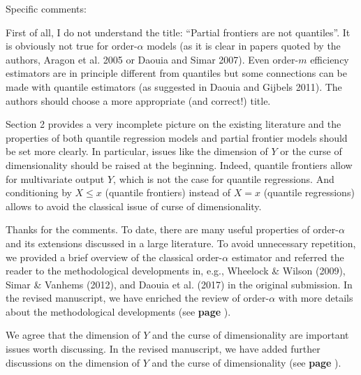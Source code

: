 \documentclass[12pt]{article}
\newcommand{\np}{\vskip 0.3cm}
\begin{document}
\np
\np
\np
\begin{sf}
{\blueb Specific comments: \np

First of all, I do not understand the title: ``Partial frontiers are not quantiles''. It is obviously not true for order-$\alpha$ models (as it is clear in papers quoted by the authors, Aragon et al. 2005 or Daouia and Simar 2007). Even order-$m$ efficiency estimators are in principle different from quantiles but some connections can be made with quantile estimators (as suggested in Daouia and Gijbels 2011). The authors should choose a more appropriate (and correct!) title.}
\end{sf}
\begin{response}





\end{response}


\np
\np
\np
\begin{sf}
{\blueb 
Section 2 provides a very incomplete picture on the existing literature and the properties of both quantile regression models and partial frontier models should be set more clearly. In particular, issues like the dimension of $Y$ or the curse of dimensionality should be raised at the beginning. Indeed, quantile frontiers allow for multivariate output $Y$, which is not the case for quantile regressions. And conditioning by $X \le x$ (quantile frontiers) instead of $X = x$ (quantile regressions) allows to avoid the classical issue of curse of dimensionality. }
\end{sf}
\begin{response}
Thanks for the comments. To date, there are many useful properties of order-$\alpha$ and its extensions discussed in a large literature. To avoid unnecessary repetition, we provided a brief overview of the classical order-$\alpha$ estimator and referred the reader to the methodological developments in, e.g., Wheelock \& Wilson (2009), Simar \& Vanhems (2012), and Daouia et al. (2017) in the original submission. In the revised manuscript, we have enriched the review of order-$\alpha$ with more details about the methodological developments (see \textbf{page }).\np

We agree that the dimension of $Y$ and the curse of dimensionality are important issues worth discussing. In the revised manuscript, we have added further discussions on the dimension of $Y$ and the curse of dimensionality (see \textbf{page }).

\end{response}
\end{document}
